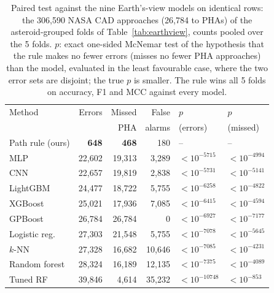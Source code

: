 \begin{table}[t]
\centering
\footnotesize
\caption{Paired test against the nine Earth's-view models on identical rows: the 306,590 NASA CAD approaches (26,784 to PHAs) of the asteroid-grouped folds of Table~\ref{tab:earthview}, counts pooled over the 5 folds. $p$: exact one-sided McNemar test of the hypothesis that the rule makes no fewer errors (misses no fewer PHA approaches) than the model, evaluated in the least favourable case, where the two error sets are disjoint; the true $p$ is smaller. The rule wins all 5 folds on accuracy, F1 and MCC against every model.}
\label{tab:sota}
\setlength{\tabcolsep}{3pt}
\begin{tabular}{@{}lrrrll@{}}
\toprule
Method & Errors & Missed & False & $p$ & $p$ \\
 & & PHA & alarms & (errors) & (missed) \\
\midrule
Path rule (ours) & \textbf{648} & \textbf{468} & 180 & -- & -- \\
\midrule
MLP & 22,602 & 19,313 & 3,289 & $<10^{-5715}$ & $<10^{-4994}$ \\
CNN & 22,657 & 19,819 & 2,838 & $<10^{-5731}$ & $<10^{-5141}$ \\
LightGBM & 24,477 & 18,722 & 5,755 & $<10^{-6258}$ & $<10^{-4822}$ \\
XGBoost & 25,021 & 17,936 & 7,085 & $<10^{-6415}$ & $<10^{-4594}$ \\
GPBoost & 26,784 & 26,784 & 0 & $<10^{-6927}$ & $<10^{-7177}$ \\
Logistic reg. & 27,303 & 21,548 & 5,755 & $<10^{-7078}$ & $<10^{-5645}$ \\
$k$-NN & 27,328 & 16,682 & 10,646 & $<10^{-7085}$ & $<10^{-4231}$ \\
Random forest & 28,324 & 16,189 & 12,135 & $<10^{-7375}$ & $<10^{-4089}$ \\
Tuned RF & 39,846 & 4,614 & 35,232 & $<10^{-10748}$ & $<10^{-853}$ \\
\bottomrule
\end{tabular}
\end{table}

